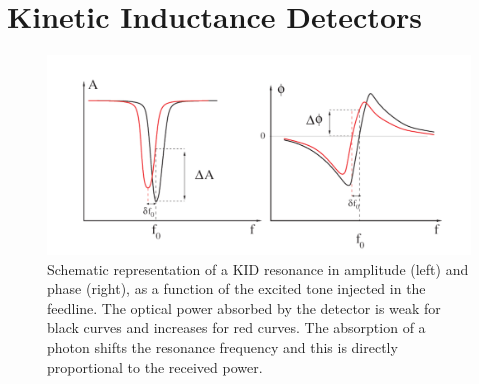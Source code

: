 
\section{Kinetic Inductance Detectors}
\label{se:kids}


%



\begin{figure}
  \includegraphics[clip, angle=0, width=\columnwidth]{../Figures/resonance.png}
  \caption{Schematic representation of a KID resonance in amplitude (left) and phase (right), as a function of the excited tone injected in the feedline. The optical power absorbed by the detector is weak for black curves and increases for red curves. The absorption of a photon shifts the resonance frequency and this is directly proportional to the received power.}
  \label{resonance}
\end{figure}

